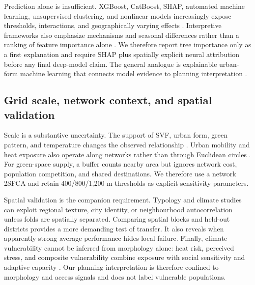 Prediction alone is insufficient. XGBoost, CatBoost, SHAP, automated machine
learning, unsupervised clustering, and nonlinear models increasingly expose
thresholds, interactions, and geographically varying effects
\citep{ma2024XgboostBased,liu2025UnveilinDifferen,
xu2025CharacteThermal,wang2025RevealinImpact,
liu2026UnderstaNonlinea,wan2026AnalyzinImpact}. Interpretive frameworks also
emphasize mechanisms and seasonal differences rather than a ranking of feature
importance alone \citep{han2025PerspectUndersta,
wang2025SeasonalEffects}. We therefore report tree importance only as a first
explanation and require SHAP plus spatially explicit neural attribution before
any final deep-model claim. The general analogue is explainable urban-form
machine learning that connects model evidence to planning interpretation
\citep{karl2026RelationBetween}.

\subsection{Grid scale, network context, and spatial validation}

Scale is a substantive uncertainty. The support of SVF, urban form, green
pattern, and temperature changes the observed relationship
\citep{middel2018ViewFactor,wu2022ScaleEffect,hu2025ComparinGreen,
li2026InvestigEffect}. Urban mobility and heat exposure also operate along
networks rather than through Euclidean circles \citep{zhang2025MobilitiHeat}.
For green-space supply, a buffer counts nearby area but ignores network cost,
population competition, and shared destinations. We therefore use a network
2SFCA and retain 400/800/1,200 m thresholds as explicit sensitivity parameters.

Spatial validation is the companion requirement. Typology and climate studies
can exploit regional texture, city identity, or neighbourhood autocorrelation
unless folds are spatially separated. Comparing spatial blocks and held-out
districts provides a more demanding test of transfer. It also reveals when
apparently strong average performance hides local failure. Finally, climate
vulnerability cannot be inferred from morphology alone: heat risk, perceived
stress, and composite vulnerability combine exposure with social sensitivity
and adaptive capacity \citep{mashhoodi2024UrbanForm,iqbal2025DoesPerceive,
turner2025DevelopmValidati}. Our planning interpretation is therefore confined
to morphology and access signals and does not label vulnerable populations.


